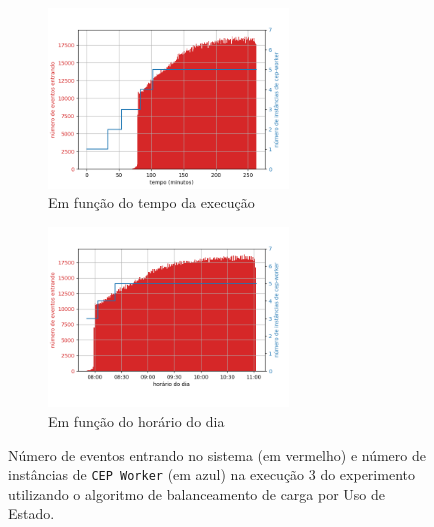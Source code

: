 \begin{figure}[h]
\centering
\begin{subfigure}{\textwidth}
\centering
\includegraphics[width=0.7\textwidth]{figuras/graphics/carga_e_workers_total8-dez-su.png}
\caption{Em função do tempo da execução}
\label{fig:workers_and_load_total_8-dez-su}
\end{subfigure}%

\begin{subfigure}{\textwidth}
\centering
\includegraphics[width=0.7\textwidth]{figuras/graphics/carga_e_workers_horario8-dez-su.png}
\caption{Em função do horário do dia}
\label{fig:workers_and_load_SPtrans_8-dez-su}
\end{subfigure}%
\caption{Número de eventos entrando no sistema (em vermelho) e número de instâncias de \texttt{CEP Worker} (em azul) na execução 3 do experimento utilizando o algoritmo de balanceamento de carga por Uso de Estado.}
\end{figure}




